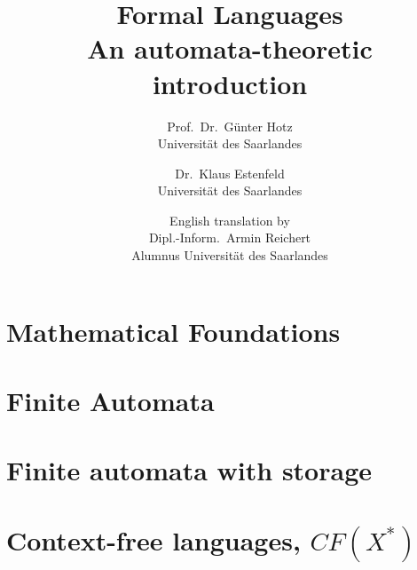 \documentclass[a4paper]{amsbook}
\title{Formal Languages\\An automata-theoretic introduction}
\author{Prof.\ Dr.\ Günter Hotz\\Universität des Saarlandes
\and Dr.\ Klaus Estenfeld\\Universität des Saarlandes
\and English translation by\\Dipl.-Inform.\ Armin Reichert\\Alumnus Universität
des Saarlandes}
\begin{document}
\maketitle

\tableofcontents

\chapter{Mathematical Foundations}






\chapter{Finite Automata}








\chapter{Finite automata with storage}





\chapter{Context-free languages, $CF(X^*)$}




\nocite{*}

\end{document}
